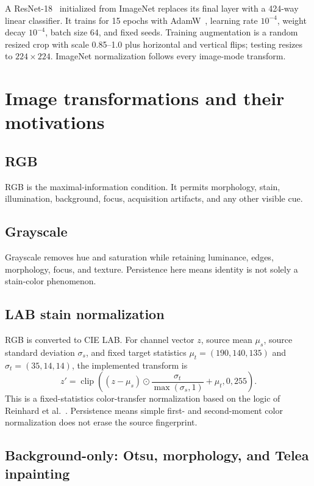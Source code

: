 \documentclass[11pt,oneside]{report}
\begin{document}
A ResNet-18~\cite{he2016resnet} initialized from ImageNet replaces its final layer with a 424-way linear classifier. It trains for 15 epochs with AdamW~\cite{loshchilov2019adamw}, learning rate $10^{-4}$, weight decay $10^{-4}$, batch size 64, and fixed seeds. Training augmentation is a random resized crop with scale 0.85--1.0 plus horizontal and vertical flips; testing resizes to $224\times224$. ImageNet normalization follows every image-mode transform.

\section{Image transformations and their motivations}

\subsection{RGB}
RGB is the maximal-information condition. It permits morphology, stain, illumination, background, focus, acquisition artifacts, and any other visible cue.

\subsection{Grayscale}
Grayscale removes hue and saturation while retaining luminance, edges, morphology, focus, and texture. Persistence here means identity is not solely a stain-color phenomenon.

\subsection{LAB stain normalization}
RGB is converted to CIE LAB. For channel vector $z$, source mean $\mu_s$, source standard deviation $\sigma_s$, and fixed target statistics $\mu_t=(190,140,135)$ and $\sigma_t=(35,14,14)$, the implemented transform is
\begin{equation}
z'=\operatorname{clip}\left((z-\mu_s)\odot\frac{\sigma_t}{\max(\sigma_s,1)}+\mu_t,0,255\right).
\end{equation}
This is a fixed-statistics color-transfer normalization based on the logic of Reinhard et al.~\cite{reinhard2001color}. Persistence means simple first- and second-moment color normalization does not erase the source fingerprint.

\subsection{Background-only: Otsu, morphology, and Telea inpainting}
\end{document}
